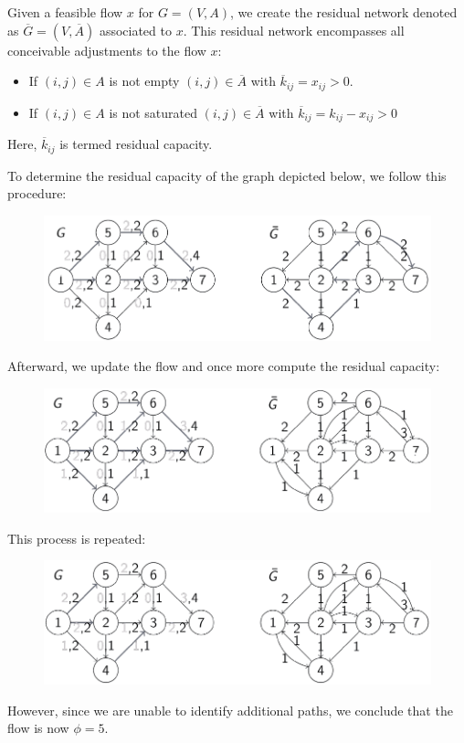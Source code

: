 \documentclass[12pt, a4paper]{report}
\begin{document}
    Given a feasible flow $x$ for $G=(V,A)$, we create the residual network denoted as $\overline{G}=(V,\overline{A})$ associated to $x$. 
    This residual network encompasses all conceivable adjustments to the flow $x$: 
    \begin{itemize}
        \item If $(i,j) \in A$ is not empty $(i,j) \in \overline{A}$ with $\overline{k}_{ij}=x_{ij}>0$.
        \item If $(i,j) \in A$ is not saturated $(i,j) \in \overline{A}$ with $\overline{k}_{ij}=k_{ij}-x_{ij}>0$
    \end{itemize}
    Here, $\overline{k}_{ij}$ is termed residual capacity. 
    \begin{example}
        To determine the residual capacity of the graph depicted below, we follow this procedure:
        \begin{figure}[H]
            \centering
            \includegraphics[width=0.75\linewidth]{images/residual1.png}
        \end{figure}
        Afterward, we update the flow and once more compute the residual capacity:
        \begin{figure}[H]
            \centering
            \includegraphics[width=0.75\linewidth]{images/residual2.png}
        \end{figure}
        This process is repeated:
        \begin{figure}[H]
            \centering
            \includegraphics[width=0.75\linewidth]{images/residual3.png}
        \end{figure}
        However, since we are unable to identify additional paths, we conclude that the flow is now $\phi=5$.
    \end{example}
\end{document}
